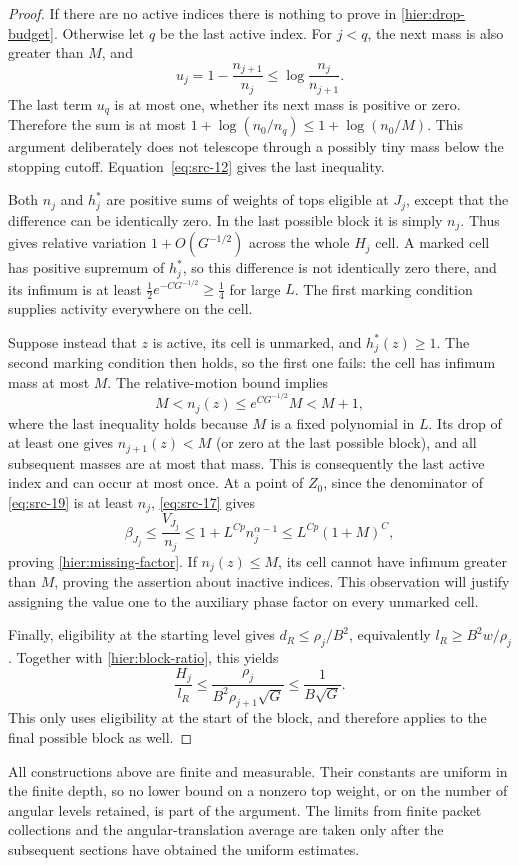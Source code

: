 \begin{proof}
If there are no active indices there is nothing to prove in
\eqref{hier:drop-budget}.  Otherwise let $q$ be the last active index.
For $j<q$, the next mass is also greater than $M$, and
\[
 u_j=1-\frac{n_{j+1}}{n_j}
 \le\log\frac{n_j}{n_{j+1}}.
\]
The last term $u_q$ is at most one, whether its next mass is positive
or zero.  Therefore the sum is at most
$1+\log(n_0/n_q)\le1+\log(n_0/M)$.  This argument deliberately does
not telescope through a possibly tiny mass below the stopping cutoff.
Equation~\eqref{eq:src-12} gives the last inequality.

Both $n_j$ and $h_j^*$ are positive sums of weights of tops eligible
at $J_j$, except that the difference can be identically zero.  In the
last possible block it is simply $n_j$.  Thus
 gives relative variation
$1+O(G^{-1/2})$ across the whole $H_j$ cell.  A marked cell has positive
supremum of $h_j^*$, so this difference is not identically zero there,
and its infimum is at least
$\tfrac12 e^{-CG^{-1/2}}\ge\tfrac14$ for large $L$.
The first marking condition supplies activity everywhere on the cell.

Suppose instead that $z$ is active, its cell is unmarked, and
$h_j^*(z)\ge1$.  The second marking condition then holds, so the first
one fails: the cell has infimum mass at most $M$.  The relative-motion
bound implies
\[
 M<n_j(z)\le e^{CG^{-1/2}}M<M+1,
\]
where the last inequality holds because $M$ is a fixed polynomial in
$L$.  Its drop of at least one gives $n_{j+1}(z)<M$ (or zero at the
last possible block), and all subsequent masses are at most that mass.
This is consequently the last active index and can occur at most once.
At a point of $Z_0$, since the denominator of \eqref{eq:src-19} is at
least $n_j$,
\eqref{eq:src-17} gives
\[
 \beta_{J_j}
 \le\frac{V_{J_j}}{n_j}
 \le1+L^{Cp}n_j^{\alpha-1}
 \le L^{Cp}(1+M)^C,
\]
proving \eqref{hier:missing-factor}.  If $n_j(z)\le M$, its cell
cannot have infimum greater than $M$, proving the assertion about
inactive indices.  This observation will justify assigning the value
one to the auxiliary phase factor on every unmarked cell.

Finally, eligibility at the starting level gives
$d_R\le\rho_j/B^2$, equivalently $l_R\ge B^2w/\rho_j$.
Together with \eqref{hier:block-ratio}, this yields
\[
 \frac{H_j}{l_R}
 \le\frac{\rho_j}{B^2\rho_{j+1}\sqrt G}
 \le\frac1{B\sqrt G}.
\]
This only uses eligibility at the start of the block, and therefore
applies to the final possible block as well.
\end{proof}

All constructions above are finite and measurable.  Their constants are
uniform in the finite depth, so no lower bound on a nonzero top weight,
or on the number of angular levels retained, is part of the argument.
The limits from finite packet collections and the angular-translation
average are taken only after the subsequent sections have obtained the
uniform estimates.

